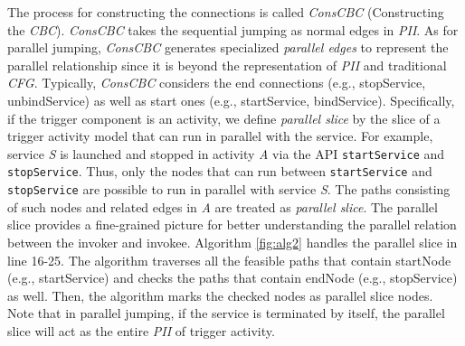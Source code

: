 The process for constructing the connections is called \textit{ConsCBC} (Constructing the \textit{CBC}). \textit{ConsCBC} takes the sequential jumping as normal edges in \textit{PII}. As for parallel jumping, \textit{ConsCBC} generates specialized \textit{parallel edges} to represent the parallel relationship since it is beyond the representation of \textit{PII} and traditional \textit{CFG}. Typically, \textit{ConsCBC} considers the end connections (e.g., stopService, unbindService) as well as start ones (e.g., startService, bindService). Specifically, if the trigger component is an activity, we define \textit{parallel slice} by the slice of a trigger activity model that can run in parallel with the service. For example, service \textit{S} is launched and stopped in activity \textit{A} via the API \texttt{startService} and \texttt{stopService}. Thus, only the nodes that can run between \texttt{startService} and \texttt{stopService} are possible to run in parallel with service \textit{S}. The paths consisting of such nodes and related edges in \textit{A} are treated as \textit{parallel slice}. The parallel slice provides a fine-grained picture for better understanding the parallel relation between the invoker and invokee. Algorithm \ref{fig:alg2} handles the parallel slice in line 16-25. The algorithm traverses all the feasible paths that contain startNode (e.g., startService) and checks the paths that contain endNode (e.g., stopService) as well. Then, the algorithm marks the checked nodes as parallel slice nodes. Note that in parallel jumping, if the service is terminated by itself, the parallel slice will act as the entire \textit{PII} of trigger activity.



